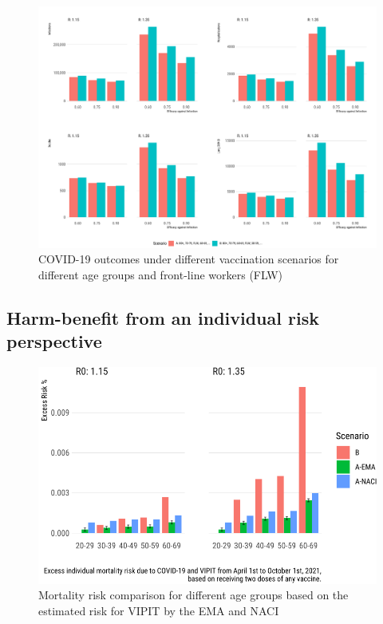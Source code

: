 \documentclass[]{interact}
\theoremstyle{plain}%
\theoremstyle{definition}
\theoremstyle{remark}
\begin{document}
\begin{figure}

{\centering \includegraphics[width=1\linewidth]{../figures/fig-barplots} 

}

\caption{COVID-19 outcomes under different vaccination scenarios for different age groups and front-line workers (FLW)}\label{fig:fig2}
\end{figure}

\hypertarget{harm-benefit-from-an-individual-risk-perspective}{%
\subsection{Harm-benefit from an individual risk
perspective}\label{harm-benefit-from-an-individual-risk-perspective}}

\begin{figure}

{\centering \includegraphics[width=0.9\linewidth]{theCaseforAZ_files/figure-latex/covidvsvipit-1} 

}

\caption{Mortality risk comparison for different age groups based on the estimated risk for VIPIT by the EMA and NACI}\label{fig:covidvsvipit}
\end{figure}
\end{document}

